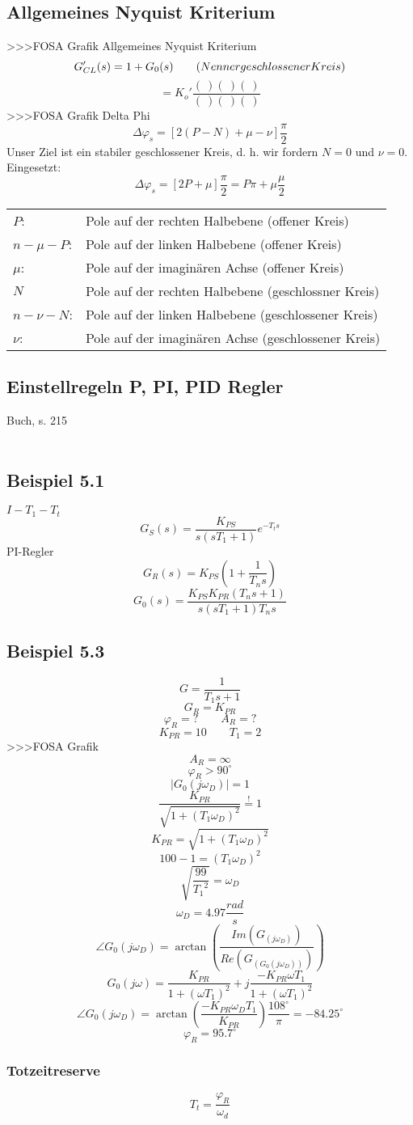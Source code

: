 \subsection{Allgemeines Nyquist Kriterium}
>>>FOSA Grafik Allgemeines Nyquist Kriterium
\[ G'_{CL}(s) = 1 + G_0(s) \qquad \text(Nenner geschlossener Kreis) \]
\[ = K_o' \frac{(~) (~) (~)}{(~) (~) (~)} \]
>>>FOSA Grafik Delta Phi
\[ \Delta\varphi_s = [2 (P - N) + \mu - \nu] \frac{\pi}{2} \]
Unser Ziel ist ein stabiler geschlossener Kreis, d. h. wir fordern $N = 0$ und $\nu = 0$. Eingesetzt: 
\[ \Delta\varphi_s = [2 P + \mu] \frac{\pi}{2} = P \pi + \mu \frac{\mu}{2} \]
\begin{tabular}{ll}
    $P$:            & Pole auf der rechten Halbebene (offener Kreis) \\
    $n - \mu - P$:  & Pole auf der linken Halbebene (offener Kreis) \\
    $\mu$:          & Pole auf der imaginären Achse (offener Kreis) \\
    $N$             & Pole auf der rechten Halbebene (geschlossner Kreis) \\
    $n - \nu - N$:  & Pole auf der linken Halbebene (geschlossener Kreis) \\
    $\nu$:          & Pole auf der imaginären Achse (geschlossener Kreis) \\
\end{tabular}

\subsection{Einstellregeln P, PI, PID Regler}
Buch, s. 215\\\\

\subsection*{Beispiel 5.1}
$I-T_1-T_t$
\[ G_S(s) = \frac{K_{PS}}{s (s T_1 + 1)} e^{-T_t s} \]
PI-Regler
\[ G_R(s) = K_{PS} \left(1 + \frac{1}{T_n s}\right) \]
\[ G_0(s) = \frac{K_{PS} K_{PR} (T_n s + 1)}{s (s T_1 + 1) T_n s} \]

\subsection*{Beispiel 5.3}
\[ G = \frac{1}{T_1 s + 1} \]
\[ G_R = K_{PR} \]
\[ \varphi_R = ? \qquad A_R = ? \]
\[ K_{PR} = 10 \qquad T_1 = 2 \]
>>>FOSA Grafik
\[ A_R = \infty \]
\[ \varphi_R > 90^\circ \]
\[ |G_0(j \omega_D)| = 1 \]
\[ \frac{K_{PR}}{\sqrt{1 + (T_1 \omega_D)^2}} \stackrel{!}{=} 1 \]
\[ K_{PR} = \sqrt{1 + (T_1 \omega_D)^2} \]
\[ 100 - 1 = (T_1 \omega_D)^2 \]
\[ \sqrt{\frac{99}{{T_1}^2}} = \omega_D \]
\[ \omega_D = 4.97 \frac{rad}{s} \]
\[ \angle G_0(j \omega_D) = \arctan\left(\frac{Im(G_(j\omega_D))}{Re(G_(G_0(j\omega_D)))}\right) \] 
\[ G_0(j\omega) = \frac{K_{PR}}{1 + (\omega T_1)^2} + j \frac{-K_{PR}\omega T_1}{1 + (\omega T_1)^2} \]
\[ \angle G_0(j\omega_D) = \arctan\left(\frac{-K_{PR} \omega_D T_1}{K_{PR}}\right) \frac{108^\circ}{\pi} = -84.25^\circ \]
\[ \varphi_R = 95.7^\circ \]

\subsubsection{Totzeitreserve}
\[ T_t = \frac{\varphi_R}{\omega_d} \]


